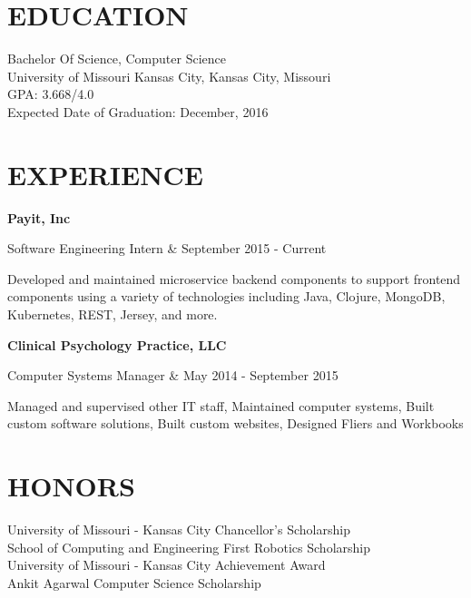 \documentclass[margin,10pt]{res} %
\begin{document}

\address{ 5534 Lydia Avenue \\ Kansas City, Missouri 64112 \\
(913) 908-6148 \\ cdrm4@mail.umkc.edu \\ http://octopuscabbage.github.io \\}

\begin{resume}
 
\section{EDUCATION}       
 Bachelor Of Science, Computer Science  \\
                University of Missouri Kansas City, Kansas City, Missouri \\ 
                GPA: 3.668/4.0 \\
                Expected Date of Graduation: December, 2016
 
 
\section{EXPERIENCE}      

		{\bf Payit, Inc} \\
			\begin{ncolumn}{2}
			Software Engineering Intern & September 2015 - Current
			\end{ncolumn}
			Developed and maintained microservice backend components to support frontend components using a variety of technologies including Java, Clojure, MongoDB, Kubernetes, REST, Jersey, and more.
			
		{\bf Clinical Psychology Practice, LLC} \\
			\begin{ncolumn}{2}
			Computer Systems Manager & May 2014 - September 2015
			\end{ncolumn}
			Managed and supervised other IT staff, Maintained computer systems, Built custom software solutions, Built custom websites, Designed Fliers and Workbooks
		
 
 
\section{HONORS}
University of Missouri - Kansas City Chancellor's Scholarship \\
School of Computing and Engineering First Robotics Scholarship \\ 
University of Missouri - Kansas City Achievement Award  \\
Ankit Agarwal Computer Science Scholarship


\end{resume}
\end{document}
